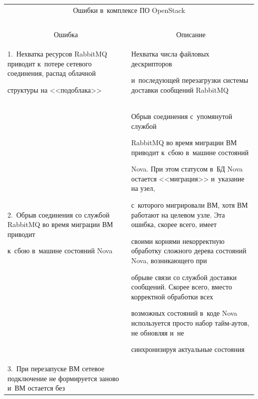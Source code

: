   \begin{table}\small


  \begin{center}


  


  \begin{tabular}{|p{30mm}|p{91mm}|}


  \multicolumn{2}{c}{Ошибки в~комплексе ПО OpenStack}\\


  \multicolumn{2}{c}{\ }\\[-6pt]


  \hline


\multicolumn{1}{|c|}{Ошибка}&\multicolumn{1}{c|}{Описание}\\


\hline


1.~Нехватка ресурсов RabbitMQ приводит к~потере сетевого соединения, распад облачной 


структуры на <<подоблака>>~\cite{3-g7}&Нехватка числа файловых дескрипторов 


и~последующей перезагрузки системы доставки сообщений RabbitMQ\\


\hline


2.~Обрыв соединения со службой RabbitMQ во время миграции ВМ приводит 


к~сбою в~машине состояний Nova~\cite{4-g7}&Обрыв соединения с~упомянутой службой 


RabbitMQ во время миграции ВМ приводит к~сбою в~машине состояний 


Nova. При этом статусом в~БД Nova остается <<миграция>> и~указание на узел, 


с~которого мигрировали ВМ, хотя ВМ работают на целевом узле. Эта ошибка, скорее всего, имеет 


своими корнями некорректную обработку сложного дерева состояний Nova, возникающего при 


обрыве связи со службой доставки сообщений. Скорее всего, вместо корректной обработки всех 


возможных состояний в~коде Nova используется просто набор тайм-аутов, не обновляя и~не 


синхронизируя актуальные состояния\\


\hline


3.~При перезапуске ВМ сетевое подключение не формируется заново и~ВМ остается без 



\end{tabular}
\end{center}
\end{table}
